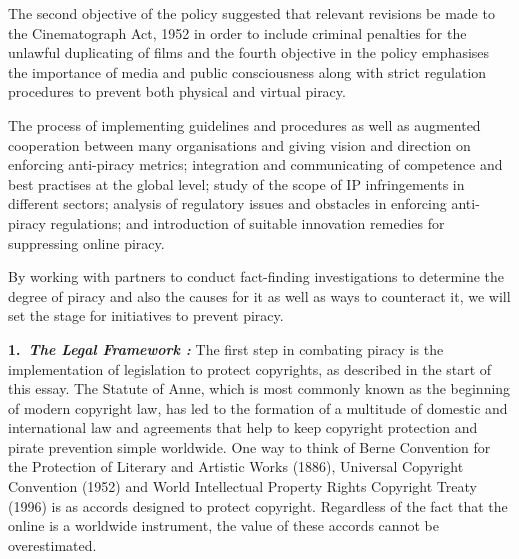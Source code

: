 \begin{multicols}{2}
\vspace{-.1cm}

\noi
The second objective of the policy suggested that relevant revisions be made to the
Cinematograph Act, 1952 in order to include criminal penalties for the unlawful duplicating
of films and the fourth objective in the policy emphasises the importance of media and public
consciousness along with strict regulation procedures to prevent both physical and virtual
piracy.

\vspace{-.1cm}

\noi
The process of implementing guidelines and procedures as well as augmented cooperation
between many organisations and giving vision and direction on enforcing anti-piracy metrics;
integration and communicating of competence and best practises at the global level; study of
the scope of IP infringements in different sectors; analysis of regulatory issues and obstacles
in enforcing anti-piracy regulations; and introduction of suitable innovation remedies for
suppressing online piracy.

\vspace{-.1cm}

\noi
By working with partners to conduct fact-finding investigations to determine the degree of
piracy and also the causes for it as well as ways to counteract it, we will set the stage for
initiatives to prevent piracy.


\noi
{\large \bfseries 1.~\textit{The Legal Framework :}} The first step in combating piracy is the implementation of
legislation to protect copyrights, as described in the start of this essay. The Statute of
Anne, which is most commonly known as the beginning of modern copyright law, has
led to the formation of a multitude of domestic and international law and agreements
that help to keep copyright protection and pirate prevention simple worldwide. One
way to think of Berne Convention for the Protection of Literary and Artistic Works
(1886), Universal Copyright Convention (1952) and World Intellectual Property
Rights Copyright Treaty (1996) is as accords designed to protect copyright.
Regardless of the fact that the online is a worldwide instrument, the value of these
accords cannot be overestimated.


\end{multicols}
